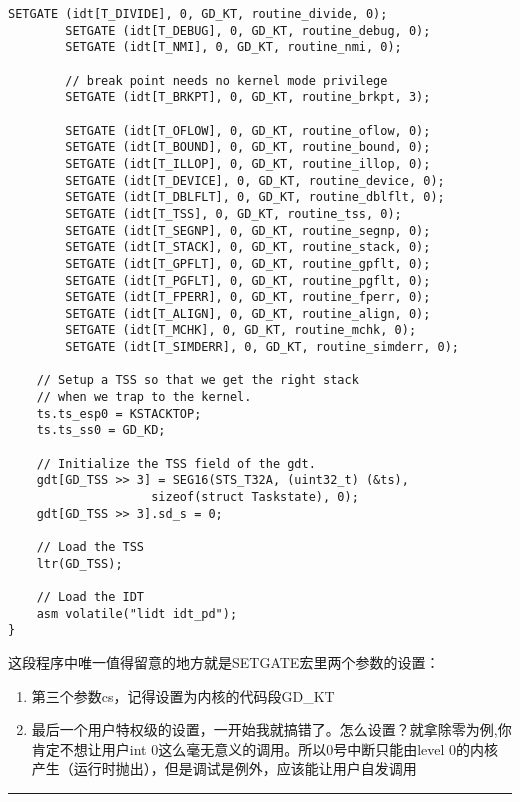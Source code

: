 \documentclass{article}
\begin{document}
\begin{CJK*}{UTF8}{gkai}
\begin{lstlisting}[style=ccode, title={\scriptsize \ttfamily \bfseries kern/trap.c: idt\_init()}]
        SETGATE (idt[T_DIVIDE], 0, GD_KT, routine_divide, 0);
        SETGATE (idt[T_DEBUG], 0, GD_KT, routine_debug, 0);
        SETGATE (idt[T_NMI], 0, GD_KT, routine_nmi, 0);

        // break point needs no kernel mode privilege
        SETGATE (idt[T_BRKPT], 0, GD_KT, routine_brkpt, 3);

        SETGATE (idt[T_OFLOW], 0, GD_KT, routine_oflow, 0);
        SETGATE (idt[T_BOUND], 0, GD_KT, routine_bound, 0);
        SETGATE (idt[T_ILLOP], 0, GD_KT, routine_illop, 0);
        SETGATE (idt[T_DEVICE], 0, GD_KT, routine_device, 0);
        SETGATE (idt[T_DBLFLT], 0, GD_KT, routine_dblflt, 0);
        SETGATE (idt[T_TSS], 0, GD_KT, routine_tss, 0);
        SETGATE (idt[T_SEGNP], 0, GD_KT, routine_segnp, 0);
        SETGATE (idt[T_STACK], 0, GD_KT, routine_stack, 0);
        SETGATE (idt[T_GPFLT], 0, GD_KT, routine_gpflt, 0);
        SETGATE (idt[T_PGFLT], 0, GD_KT, routine_pgflt, 0);
        SETGATE (idt[T_FPERR], 0, GD_KT, routine_fperr, 0);
        SETGATE (idt[T_ALIGN], 0, GD_KT, routine_align, 0);
        SETGATE (idt[T_MCHK], 0, GD_KT, routine_mchk, 0);
        SETGATE (idt[T_SIMDERR], 0, GD_KT, routine_simderr, 0);

	// Setup a TSS so that we get the right stack
	// when we trap to the kernel.
	ts.ts_esp0 = KSTACKTOP;
	ts.ts_ss0 = GD_KD;

	// Initialize the TSS field of the gdt.
	gdt[GD_TSS >> 3] = SEG16(STS_T32A, (uint32_t) (&ts),
					sizeof(struct Taskstate), 0);
	gdt[GD_TSS >> 3].sd_s = 0;

	// Load the TSS
	ltr(GD_TSS);

	// Load the IDT
	asm volatile("lidt idt_pd");
}
\end{lstlisting}

这段程序中唯一值得留意的地方就是SETGATE宏里两个参数的设置：

\begin{enumerate}
\item{第三个参数cs，记得设置为内核的代码段GD\_KT}
\item{最后一个用户特权级的设置，一开始我就搞错了。怎么设置？就拿除零为例,你肯定不想让用户int 0这么毫无意义的调用。所以0号中断只能由level 0的内核产生（运行时抛出），但是调试是例外，应该能让用户自发调用}
\end{enumerate}

\vspace{2em}

\hrule

\vspace{2em}


\end{CJK*}
\end{document}
